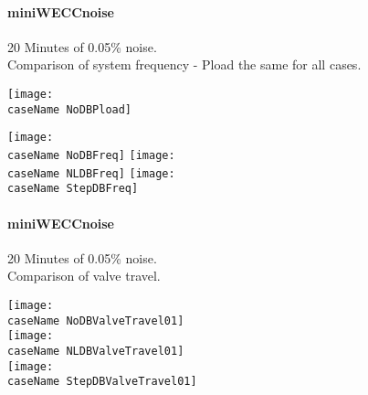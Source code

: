 \documentclass[12pt]{article}
\newcommand{\caseName}{ }
\begin{document}
\renewcommand{\caseName}{miniWECCnoise}
\paragraph{\caseName} 20 Minutes of 0.05\% noise.\\
Comparison of system frequency - Pload the same for all cases.

	\texttt{[image: \\caseName NoDBPload]}
	
	\texttt{[image: \\caseName NoDBFreq]} 
	\texttt{[image: \\caseName NLDBFreq]} 
	\texttt{[image: \\caseName StepDBFreq]} 
	
\pagebreak
\paragraph{\caseName} 20 Minutes of 0.05\% noise.\\
Comparison of valve travel.
\begin{center}
	\texttt{[image: \\caseName NoDBValveTravel01]} \\
	\texttt{[image: \\caseName NLDBValveTravel01]} \\
	\texttt{[image: \\caseName StepDBValveTravel01]} 
\end{center}
	
\pagebreak
\end{document}
